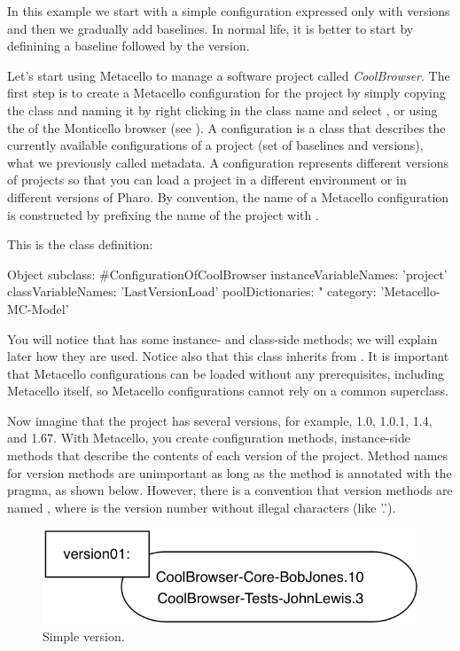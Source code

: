 \documentclass[a4paper,10pt,twoside]{book}
\begin{document}
In this example we start with a simple configuration expressed only with versions and then we gradually add baselines. In normal life, it is better to start by definining a baseline followed by the version.

Let's start using Metacello to manage a software project called \emph{CoolBrowser}. The first step is to create a Metacello configuration for the project by simply copying the class  and naming it  by right clicking in the class name and select , or using the  of the Monticello browser (see ). A configuration is a class that describes the currently available configurations of a project (set of baselines and versions), \ie what we previously called metadata. A configuration represents different versions of projects so that you can load a project in a different environment or in different versions of Pharo.
By convention, the name of a Metacello configuration is constructed by prefixing the name of the project with .

This is the class definition:
\begin{code}{}
Object subclass: #ConfigurationOfCoolBrowser
       instanceVariableNames: 'project'
       classVariableNames: 'LastVersionLoad'
       poolDictionaries: "
       category: 'Metacello-MC-Model'
\end{code}

You will notice that  has some instance- and class-side methods; we will explain later how they are used. Notice also that this class inherits from .  It is important that Metacello configurations can be loaded without any prerequisites, including Metacello itself, so Metacello configurations cannot rely on a common superclass.

Now imagine that the project  has several versions, for example, 1.0, 1.0.1, 1.4, and 1.67.
With Metacello, you create configuration methods, instance-side methods that describe the contents of each version of the project. Method names for version methods are unimportant as long as the method is annotated with the  pragma, as shown below.  However, there is a  convention that  version methods are named , where  is the version number without illegal characters (like '.').


\begin{figure}
\begin{center}
\includegraphics[width=0.6\linewidth]{version01}
\caption{Simple version.\label{version01}}
\end{center}
\end{figure}
\end{document}
